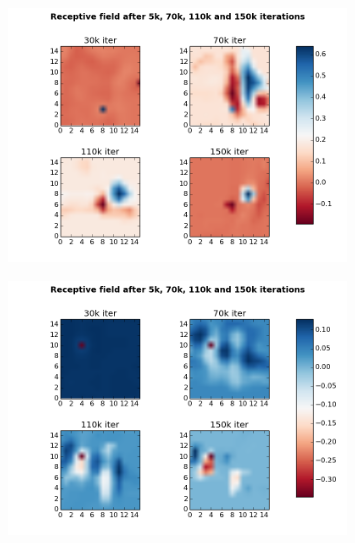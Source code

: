 \begin{figure}[H]
 \centering
 \includegraphics[width = 0.8\textwidth]{../results/exercise3b}
 \caption{}
 \label{fig:bild3}
\end{figure}

\begin{figure}[H]
 \centering
 \includegraphics[width = 0.8\textwidth]{../results/exercise3c}
 \caption{}
 \label{fig:bild4}
\end{figure}


